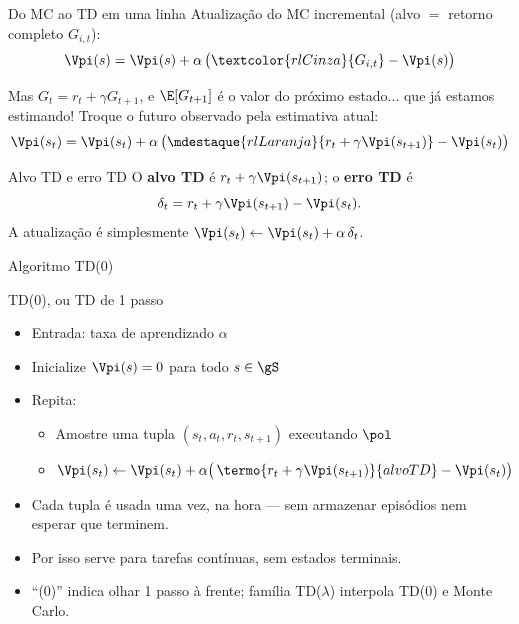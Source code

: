 \documentclass[aspectratio=169, 11pt]{beamer}
\begin{document}
\begin{frame}{Do MC ao TD em uma linha}
  Atualização do MC incremental (alvo $=$ retorno completo $G_{i,t}$):
  \[
    \Vpi(s) = \Vpi(s) + \alpha\,\bigl(\textcolor{rlCinza}{G_{i,t}} - \Vpi(s)\bigr)
  \]

  Mas $G_t = r_t + \gamma G_{t+1}$, e $\E[G_{t+1}] $ é o valor do próximo
  estado... que já estamos estimando! Troque o futuro observado pela
  estimativa atual:
  \[
    \Vpi(s_t) = \Vpi(s_t)
      + \alpha\,\bigl(\mdestaque{rlLaranja}{r_t + \gamma \Vpi(s_{t+1})} - \Vpi(s_t)\bigr)
  \]

  \begin{defbox}{Alvo TD e erro TD}
    O \textbf{alvo TD} é $r_t + \gamma \Vpi(s_{t+1})$; o \textbf{erro TD} é
    \[
      \delta_t = r_t + \gamma \Vpi(s_{t+1}) - \Vpi(s_t).
    \]
    A atualização é simplesmente $\Vpi(s_t) \leftarrow \Vpi(s_t) + \alpha\,\delta_t$.
  \end{defbox}
\end{frame}

\begin{frame}{Algoritmo TD(0)}
  \begin{algbox}{TD(0), ou TD de 1 passo}
    \begin{itemize}\setlength{\itemsep}{0.2ex}
      \item Entrada: taxa de aprendizado $\alpha$
      \item Inicialize $\Vpi(s) = 0$ para todo $s \in \gS$
      \item Repita:
      \begin{itemize}
        \item Amostre uma tupla $(s_t, a_t, r_t, s_{t+1})$ executando $\pol$
        \item $\Vpi(s_t) \leftarrow \Vpi(s_t)
          + \alpha\bigl(\,\termo{r_t + \gamma \Vpi(s_{t+1})}{alvo TD} - \Vpi(s_t)\bigr)$
      \end{itemize}
    \end{itemize}
  \end{algbox}

  \begin{itemize}
    \item Cada tupla é usada uma vez, na hora — sem armazenar episódios
      nem esperar que terminem.
    \item Por isso serve para tarefas contínuas, sem estados terminais.
    \item ``(0)'' indica olhar 1 passo à frente; família TD($\lambda$)
      interpola TD(0) e Monte Carlo.
  \end{itemize}
\end{frame}
\end{document}
